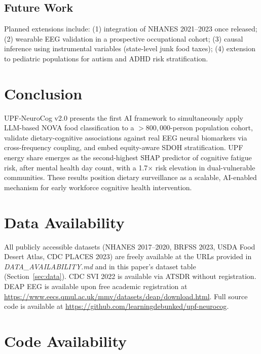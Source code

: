 \documentclass[journal]{IEEEtran}
\begin{document}
\subsection{Future Work}

Planned extensions include: (1) integration of NHANES 2021--2023 once released;
(2) wearable EEG validation in a prospective occupational cohort;
(3) causal inference using instrumental variables (state-level junk food taxes);
(4) extension to pediatric populations for autism and ADHD risk stratification.

\section{Conclusion}
\label{sec:conclusion}

UPF-NeuroCog v2.0 presents the first AI framework to simultaneously apply
LLM-based NOVA food classification to a $>800{,}000$-person population cohort,
validate dietary-cognitive associations against real EEG neural biomarkers via
cross-frequency coupling, and embed equity-aware SDOH stratification. UPF
energy share emerges as the second-highest SHAP predictor of cognitive fatigue
risk, after mental health day count, with a 1.7$\times$ risk elevation in
dual-vulnerable communities. These results position dietary surveillance as a
scalable, AI-enabled mechanism for early workforce cognitive health intervention.

\section*{Data Availability}

All publicly accessible datasets (NHANES 2017--2020, BRFSS 2023, USDA Food
Desert Atlas, CDC PLACES 2023) are freely available at the URLs provided in
\textit{DATA\_AVAILABILITY.md} and in this paper's dataset table (Section~\ref{sec:data}).
CDC SVI 2022 is available via ATSDR without registration. DEAP EEG is available
upon free academic registration at
\url{https://www.eecs.qmul.ac.uk/mmv/datasets/deap/download.html}.
Full source code is available at
\url{https://github.com/learningdebunked/upf-neurocog}.

\section*{Code Availability}
\end{document}
